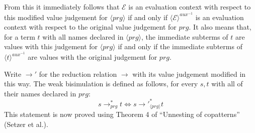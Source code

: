From this it immediately follows that $\mathcal{E}$ is an evaluation context with respect to this modified value judgement for $\langle prg \rangle$ if and only if $\langle \mathcal{E} \rangle^{aux^{-1}}$ is an evaluation context with respect to the original value judgement for $prg$. It also means that, for a term $t$ with all names declared in $\langle prg \rangle$, the immediate subterms of $t$ are values with this judgement for $\langle prg \rangle$ if and only if the immediate subterms of $\langle t \rangle^{aux^{-1}}$ are values with the original judgement for $prg$.

Write $\longrightarrow'$ for the reduction relation $\longrightarrow$ with its value judgement modified in this way. The weak bisimulation is defined as follows, for every $s,t$ with all of their names declared in $prg$:
\begin{equation}
s \longrightarrow_{prg}^* t \iff s {\longrightarrow'}_{\langle prg \rangle}^* t
\end{equation}
This statement is now proved using Theorem 4 of ``Unnesting of copatterns'' (Setzer et al.).

